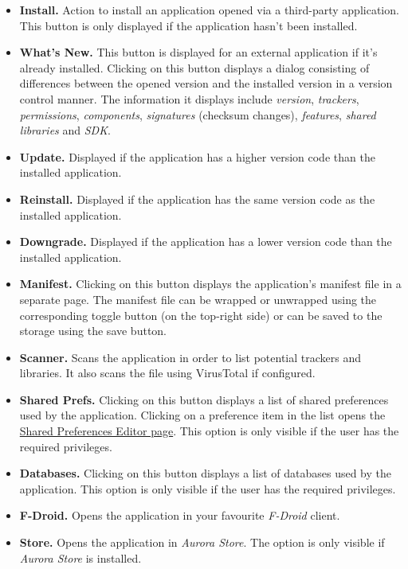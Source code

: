 \begin{itemize}
    \item \textbf{Install.} Action to install an application opened via a third-party application. This button is only
    displayed if the application hasn't been installed.

    \item \textbf{What's New.} This button is displayed for an external application if it's already installed. Clicking
    on this button displays a dialog consisting of differences between the opened version and the installed version in a
    version control manner. The information it displays include \textit{version}, \textit{trackers},
    \textit{permissions}, \textit{components}, \textit{signatures} (checksum changes), \textit{features},
    \textit{shared libraries} and \textit{SDK}.

    \item \textbf{Update.} Displayed if the application has a higher version code than the installed application.

    \item \textbf{Reinstall.} Displayed if the application has the same version code as the installed application.

    \item \textbf{Downgrade.} Displayed if the application has a lower version code than the installed application.

    \item \textbf{Manifest.} Clicking on this button displays the application's manifest file in a separate page. The
    manifest file can be wrapped or unwrapped using the corresponding toggle button (on the top-right side) or can be
    saved to the storage using the save button.

    \item \textbf{Scanner.} Scans the application in order to list potential trackers and libraries. It also scans the
    file using VirusTotal if configured.\\

    \item \textbf{Shared Prefs.} Clicking on this button displays a list of shared preferences used by the application.
    Clicking on a preference item in the list opens the \hyperref[sec:shared-preferences-editor-page]{Shared Preferences
    Editor page}. This option is only visible if the user has the required privileges.

    \item \textbf{Databases.} Clicking on this button displays a list of databases used by the application. This option
    is only visible if the user has the required privileges.

    \item \textbf{F-Droid.} Opens the application in your favourite \textit{F-Droid} client.

    \item \textbf{Store.} Opens the application in \textit{Aurora Store}. The option is only visible if \textit{Aurora
    Store} is installed.
\end{itemize}

